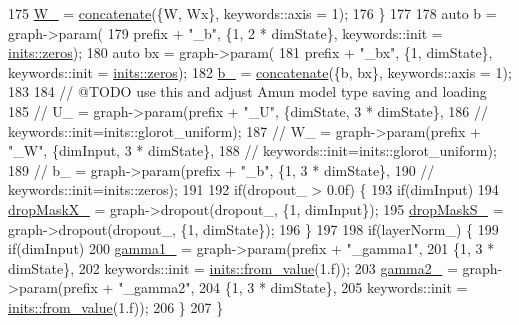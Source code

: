\begin{DoxyCode}
175       \hyperlink{classmarian_1_1rnn_1_1GRU_ab1d7208cfab36cde27cf922b197a6314}{W\_} = \hyperlink{namespacemarian_a2791a2c8f79a938f5cb22ae613680675}{concatenate}(\{W, Wx\}, keywords::axis = 1);
176     \}
177 
178     \textcolor{keyword}{auto} b = graph->param(
179         prefix + \textcolor{stringliteral}{"\_b"}, \{1, 2 * dimState\}, keywords::init = \hyperlink{namespacemarian_1_1inits_a1bd34fd256e3df7bb1e27955a7f2b359}{inits::zeros});
180     \textcolor{keyword}{auto} bx = graph->param(
181         prefix + \textcolor{stringliteral}{"\_bx"}, \{1, dimState\}, keywords::init = \hyperlink{namespacemarian_1_1inits_a1bd34fd256e3df7bb1e27955a7f2b359}{inits::zeros});
182     \hyperlink{classmarian_1_1rnn_1_1GRU_a6dc536e4a1f4803a83114a91c26dd8e4}{b\_} = \hyperlink{namespacemarian_a2791a2c8f79a938f5cb22ae613680675}{concatenate}(\{b, bx\}, keywords::axis = 1);
183 
184     \textcolor{comment}{// @TODO use this and adjust Amun model type saving and loading}
185     \textcolor{comment}{// U\_ = graph->param(prefix + "\_U", \{dimState, 3 * dimState\},}
186     \textcolor{comment}{//                  keywords::init=inits::glorot\_uniform);}
187     \textcolor{comment}{// W\_ = graph->param(prefix + "\_W", \{dimInput, 3 * dimState\},}
188     \textcolor{comment}{//                  keywords::init=inits::glorot\_uniform);}
189     \textcolor{comment}{// b\_ = graph->param(prefix + "\_b", \{1, 3 * dimState\},}
190     \textcolor{comment}{//                  keywords::init=inits::zeros);}
191 
192     \textcolor{keywordflow}{if}(dropout\_ > 0.0f) \{
193       \textcolor{keywordflow}{if}(dimInput)
194         \hyperlink{classmarian_1_1rnn_1_1GRU_a383afe82e0b8032f88bb27f192b6340c}{dropMaskX\_} = graph->dropout(dropout\_, \{1, dimInput\});
195       \hyperlink{classmarian_1_1rnn_1_1GRU_a8ccd8c5d684a9010dca0f38701dcc9fd}{dropMaskS\_} = graph->dropout(dropout\_, \{1, dimState\});
196     \}
197 
198     \textcolor{keywordflow}{if}(layerNorm\_) \{
199       \textcolor{keywordflow}{if}(dimInput)
200         \hyperlink{classmarian_1_1rnn_1_1GRU_a3902f55b7d37e9a57600508206ce95a3}{gamma1\_} = graph->param(prefix + \textcolor{stringliteral}{"\_gamma1"},
201                                \{1, 3 * dimState\},
202                                keywords::init = \hyperlink{namespacemarian_1_1inits_a03723a199ab72a38a13b2b8644e8e1c2}{inits::from\_value}(1.f));
203       \hyperlink{classmarian_1_1rnn_1_1GRU_a24fd026dbc09e0367d4c05a6cae91a3e}{gamma2\_} = graph->param(prefix + \textcolor{stringliteral}{"\_gamma2"},
204                              \{1, 3 * dimState\},
205                              keywords::init = \hyperlink{namespacemarian_1_1inits_a03723a199ab72a38a13b2b8644e8e1c2}{inits::from\_value}(1.f));
206     \}
207   \}
\end{DoxyCode}


